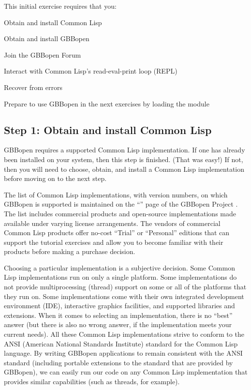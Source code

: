 \documentclass[10pt,twoside,english,pdftex]{article}
\begin{document}
This initial exercise requires that you:
\begin{tightitemize}
\item Obtain and install Common Lisp
\item Obtain and install GBBopen
\item Join the GBBopen Forum
\item Interact with Common Lisp's read-eval-print loop (REPL)
\item Recover from errors
\item Prepare to use GBBopen in the next exercises by loading the
   module
\end{tightitemize}

\fndocrule

\subsection*{Step 1: Obtain and install Common Lisp}

%
GBBopen requires a supported Common Lisp implementation.  If one has already
been installed on your system, then this step is finished.  (That was easy!)
If not, then you will need to choose, obtain, and install a Common Lisp
implementation before moving on to the next step.

The list of Common Lisp implementations, with version numbers, on which
GBBopen is supported is maintained on the ``'' page of the GBBopen Project
.  The list includes commercial
products and open-source implementations made available under varying license
arrangements.  The vendors of commercial Common Lisp products offer no-cost
``Trial'' or ``Personal'' editions that can support the tutorial exercises and
allow you to become familiar with their products before making a purchase
decision.

Choosing a particular implementation is a subjective decision.  Some Common
Lisp implementations run on only a single platform.  Some implementations do
not provide multiprocessing (thread) support on some or all of the platforms
that they run on.  Some implementations come with their own integrated
development environment (IDE), interactive graphics facilities, and supported
libraries and extensions.  When it comes to selecting an implementation, there
is no ``best'' answer (but there is also no wrong answer, if the
implementation meets your current needs).  All these Common Lisp
implementations strive to conform to the ANSI (American National Standards
Institute) standard for the Common Lisp language.  By writing GBBopen
applications to remain consistent with the ANSI standard (including portable
extensions to the standard that are provided by GBBopen), we can easily run
our code on any Common Lisp implementation that provides similar capabilities
(such as threads, for example).
\end{document}
